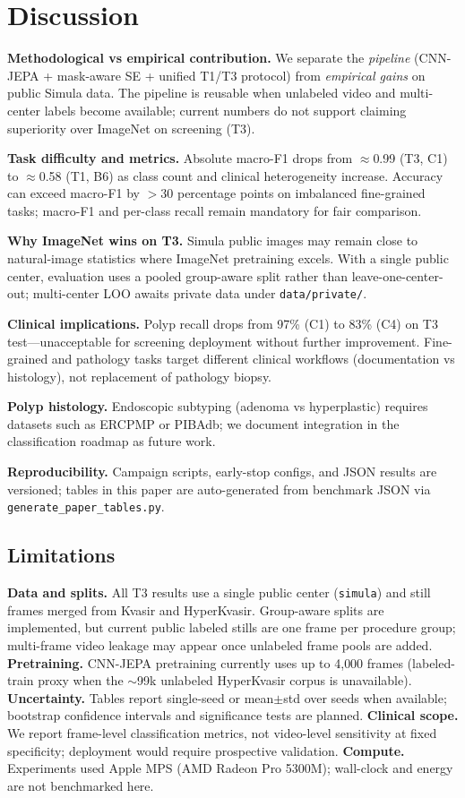\section{Discussion}
\label{sec:discussion}

\textbf{Methodological vs empirical contribution.}
We separate the \emph{pipeline} (CNN-JEPA + mask-aware SE + unified T1/T3 protocol) from \emph{empirical gains} on public Simula data.
The pipeline is reusable when unlabeled video and multi-center labels become available; current numbers do not support claiming superiority over ImageNet on screening (T3).

\textbf{Task difficulty and metrics.}
Absolute macro-F1 drops from $\approx$0.99 (T3, C1) to $\approx$0.58 (T1, B6) as class count and clinical heterogeneity increase.
Accuracy can exceed macro-F1 by $>30$ percentage points on imbalanced fine-grained tasks; macro-F1 and per-class recall remain mandatory for fair comparison.

\textbf{Why ImageNet wins on T3.}
Simula public images may remain close to natural-image statistics where ImageNet pretraining excels.
With a single public center, evaluation uses a pooled group-aware split rather than leave-one-center-out; multi-center LOO awaits private data under \texttt{data/private/}.

\textbf{Clinical implications.}
Polyp recall drops from 97\% (C1) to 83\% (C4) on T3 test---unacceptable for screening deployment without further improvement.
Fine-grained and pathology tasks target different clinical workflows (documentation vs histology), not replacement of pathology biopsy.

\textbf{Polyp histology.}
Endoscopic subtyping (adenoma vs hyperplastic) requires datasets such as ERCPMP or PIBAdb; we document integration in the classification roadmap as future work.

\textbf{Reproducibility.}
Campaign scripts, early-stop configs, and JSON results are versioned; tables in this paper are auto-generated from benchmark JSON via \texttt{generate\_paper\_tables.py}.

\subsection{Limitations}
\label{sec:limitations}

\textbf{Data and splits.} All T3 results use a single public center (\texttt{simula}) and \numsamples{} still frames merged from Kvasir and HyperKvasir.
Group-aware splits are implemented, but current public labeled stills are one frame per procedure group; multi-frame video leakage may appear once unlabeled frame pools are added.
\textbf{Pretraining.} CNN-JEPA pretraining currently uses up to 4{,}000 frames (labeled-train proxy when the $\sim$99k unlabeled HyperKvasir corpus is unavailable).
\textbf{Uncertainty.} Tables report single-seed or mean$\pm$std over seeds when available; bootstrap confidence intervals and significance tests are planned.
\textbf{Clinical scope.} We report frame-level classification metrics, not video-level sensitivity at fixed specificity; deployment would require prospective validation.
\textbf{Compute.} Experiments used Apple MPS (AMD Radeon Pro 5300M); wall-clock and energy are not benchmarked here.
